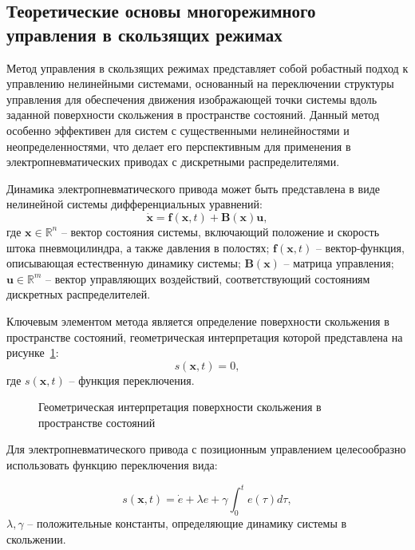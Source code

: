 \subsection{Теоретические основы многорежимного управления в скользящих режимах}\label{subsec:ch3/sec3/sub1}

Метод управления в скользящих режимах представляет собой робастный подход к управлению нелинейными системами,
основанный на переключении структуры управления для обеспечения движения изображающей точки системы вдоль заданной поверхности скольжения в
пространстве состояний. Данный метод особенно эффективен для систем с существенными нелинейностями и неопределенностями, что делает его
перспективным для применения в электропневматических приводах с дискретными распределителями.

Динамика электропневматического привода может быть представлена в виде нелинейной системы дифференциальных уравнений:
\begin{equation*}
	\dot{\mathbf{x}} = \mathbf{f}(\mathbf{x}, t) + \mathbf{B}(\mathbf{x})\mathbf{u},
\end{equation*}
где $\mathbf{x} \in \mathbb{R}^n$ -- вектор состояния системы, включающий положение и скорость штока пневмоцилиндра, а также давления в полостях;
$\mathbf{f}(\mathbf{x}, t)$ -- вектор-функция, описывающая естественную динамику системы;
$\mathbf{B}(\mathbf{x})$ -- матрица управления; $\mathbf{u} \in \mathbb{R}^m$ -- вектор управляющих воздействий, соответствующий состояниям дискретных распределителей.

Ключевым элементом метода является определение поверхности скольжения в пространстве состояний, геометрическая интерпретация которой представлена на рисунке~\ref{fig:phase_plane}:
\begin{equation*}
	s(\mathbf{x}, t) = 0,
\end{equation*}
где $s(\mathbf{x}, t)$ -- функция переключения.

\begin{figure}[ht]
	\caption{Геометрическая интерпретация поверхности скольжения в пространстве состояний}
	\label{fig:phase_plane}
\end{figure}

Для электропневматического привода с позиционным управлением целесообразно использовать функцию переключения вида:

\begin{equation*}
	s(\mathbf{x}, t) = \dot{e} + \lambda e + \gamma\int_{0}^{t}e(\tau)d\tau,
\end{equation*}
$\lambda, \gamma$ -- положительные константы, определяющие динамику системы в скольжении.

